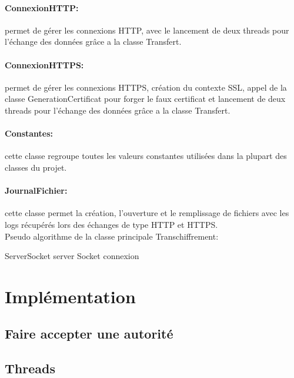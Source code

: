 \documentclass[a4paper,11pt,french]{report}
\begin{document}
	\paragraph{ConnexionHTTP:} permet de gérer les connexions HTTP, avec le lancement
	de deux threads pour l'échange des données grâce a la classe Transfert.
	\paragraph{ConnexionHTTPS:} permet de gérer les connexions HTTPS, création du contexte SSL, appel de la classe
	GenerationCertificat pour forger le faux certificat et lancement de deux threads pour l'échange des données grâce a la classe Transfert.
	\paragraph{Constantes:} cette classe regroupe toutes les valeurs constantes
	utilisées dans la plupart des classes du projet.
	\paragraph{JournalFichier:} cette classe permet la création, l'ouverture et le remplissage
	de fichiers avec les logs récupérés lors des échanges de type HTTP et HTTPS.
~~\\

Pseudo algorithme de la classe principale Transchiffrement:~~\\

\begin{algorithm}[H]
  ServerSocket server\;
  Socket connexion\;
\end{algorithm}



\section{Implémentation}
\subsection{Faire accepter une autorité}


\subsection{Threads}
\end{document}
